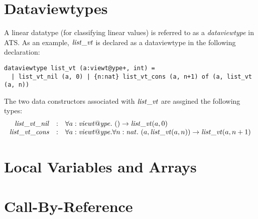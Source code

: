 \section{Dataviewtypes}
A linear datatype (for classifying linear values) is referred to as a {\it
dataviewtype} in ATS. As an example, ${\it list\_vt}$ is declared as a
dataviewtype in the following declaration:
\begin{verbatim}
dataviewtype list_vt (a:viewt@ype+, int) =
  | list_vt_nil (a, 0) | {n:nat} list_vt_cons (a, n+1) of (a, list_vt (a, n))
\end{verbatim}
The two data constructors associated with ${\it list\_vt}$ are assgined the
following types:
\[\begin{array}{rcl}
{\it list\_vt\_nil} & : &
\forall a:{\it viewt@ype}.~()\rightarrow{\it list\_vt}(a, 0) \\
{\it list\_vt\_cons} & : &
\forall a:{\it viewt@ype}.\forall n:{\it nat}.~(a, {\it list\_vt}(a, n))\rightarrow{\it list\_vt}(a, n+1) \\
\end{array}\]

\section{Local Variables and Arrays}
\section{Call-By-Reference}

